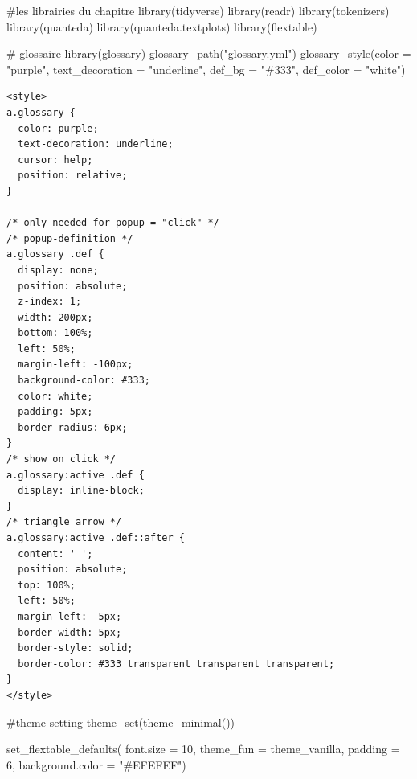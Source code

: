 \documentclass[
  letterpaper,
  DIV=11,
  numbers=noendperiod]{scrreprt}
\newenvironment{Shaded}{\begin{snugshade}}{\end{snugshade}}
\newcommand{\AttributeTok}[1]{\textcolor[rgb]{0.40,0.45,0.13}{#1}}
\newcommand{\CommentTok}[1]{\textcolor[rgb]{0.37,0.37,0.37}{#1}}
\newcommand{\DecValTok}[1]{\textcolor[rgb]{0.68,0.00,0.00}{#1}}
\newcommand{\FunctionTok}[1]{\textcolor[rgb]{0.28,0.35,0.67}{#1}}
\newcommand{\NormalTok}[1]{\textcolor[rgb]{0.00,0.23,0.31}{#1}}
\newcommand{\StringTok}[1]{\textcolor[rgb]{0.13,0.47,0.30}{#1}}
\begin{document}
\begin{Shaded}
\begin{Highlighting}[]
\CommentTok{\#les librairies du chapitre}
\FunctionTok{library}\NormalTok{(tidyverse)}
\FunctionTok{library}\NormalTok{(readr)}
\FunctionTok{library}\NormalTok{(tokenizers)}
\FunctionTok{library}\NormalTok{(quanteda)}
\FunctionTok{library}\NormalTok{(quanteda.textplots)}
\FunctionTok{library}\NormalTok{(flextable)}


\CommentTok{\# glossaire}
\FunctionTok{library}\NormalTok{(glossary)}
\FunctionTok{glossary\_path}\NormalTok{(}\StringTok{"glossary.yml"}\NormalTok{)}
\FunctionTok{glossary\_style}\NormalTok{(}\AttributeTok{color =} \StringTok{"purple"}\NormalTok{, }
               \AttributeTok{text\_decoration =} \StringTok{"underline"}\NormalTok{,}
               \AttributeTok{def\_bg =} \StringTok{"\#333"}\NormalTok{,}
               \AttributeTok{def\_color =} \StringTok{"white"}\NormalTok{)}
\end{Highlighting}
\end{Shaded}

\begin{verbatim}
<style>
a.glossary {
  color: purple;
  text-decoration: underline;
  cursor: help;
  position: relative;
}

/* only needed for popup = "click" */
/* popup-definition */
a.glossary .def {
  display: none;
  position: absolute;
  z-index: 1;
  width: 200px;
  bottom: 100%;
  left: 50%;
  margin-left: -100px;
  background-color: #333;
  color: white;
  padding: 5px;
  border-radius: 6px;
}
/* show on click */
a.glossary:active .def {
  display: inline-block;
}
/* triangle arrow */
a.glossary:active .def::after {
  content: ' ';
  position: absolute;
  top: 100%;
  left: 50%;
  margin-left: -5px;
  border-width: 5px;
  border-style: solid;
  border-color: #333 transparent transparent transparent;
}
</style>
\end{verbatim}

\begin{Shaded}
\begin{Highlighting}[]
\CommentTok{\#theme setting}
\FunctionTok{theme\_set}\NormalTok{(}\FunctionTok{theme\_minimal}\NormalTok{()) }

\FunctionTok{set\_flextable\_defaults}\NormalTok{(}
  \AttributeTok{font.size =} \DecValTok{10}\NormalTok{, }\AttributeTok{theme\_fun =}\NormalTok{ theme\_vanilla,}
  \AttributeTok{padding =} \DecValTok{6}\NormalTok{,}
  \AttributeTok{background.color =} \StringTok{"\#EFEFEF"}\NormalTok{)}
\end{Highlighting}
\end{Shaded}
\end{document}
